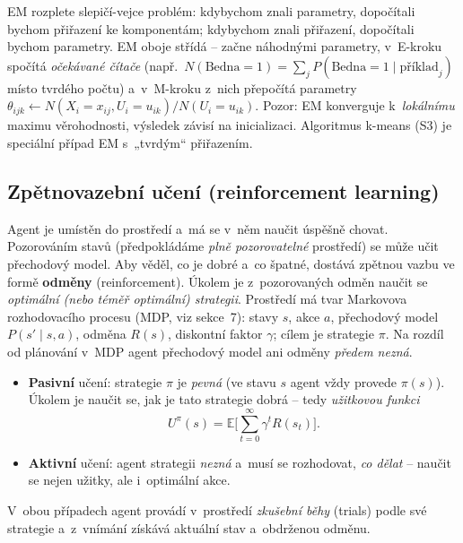 \begin{intuice}
EM rozplete slepičí-vejce problém: kdybychom znali parametry, dopočítali bychom přiřazení ke komponentám; kdybychom znali přiřazení, dopočítali bychom parametry. EM oboje střídá -- začne náhodnými parametry, v~E-kroku spočítá \emph{očekávané čítače} (např.\ $N(\text{Bedna}{=}1)=\sum_j P(\text{Bedna}{=}1\mid \text{příklad}_j)$ místo tvrdého počtu) a~v~M-kroku z~nich přepočítá parametry $\theta_{ijk}\leftarrow N(X_i{=}x_{ij},U_i{=}u_{ik})/N(U_i{=}u_{ik})$. Pozor: EM konverguje k~\emph{lokálnímu} maximu věrohodnosti, výsledek závisí na inicializaci. Algoritmus k-means (S3) je speciální případ EM s~„tvrdým`` přiřazením.
\end{intuice}

\subsection{Zpětnovazební učení (reinforcement learning)}

Agent je umístěn do prostředí a~má se v~něm naučit úspěšně chovat. Pozorováním stavů (předpokládáme \emph{plně pozorovatelné} prostředí) se může učit přechodový model. Aby věděl, co je dobré a~co špatné, dostává zpětnou vazbu ve formě \textbf{odměny} (reinforcement). Úkolem je z~pozorovaných odměn naučit se \emph{optimální (nebo téměř optimální) strategii}. Prostředí má tvar Markovova rozhodovacího procesu (MDP, viz sekce~7): stavy $s$, akce $a$, přechodový model $P(s'\mid s,a)$, odměna $R(s)$, diskontní faktor $\gamma$; cílem je strategie $\pi$. Na rozdíl od plánování v~MDP agent přechodový model ani odměny \emph{předem nezná}.

\begin{definice}
\begin{itemize}
  \item \textbf{Pasivní} učení: strategie $\pi$ je \emph{pevná} (ve stavu $s$ agent vždy provede $\pi(s)$). Úkolem je naučit se, jak je tato strategie dobrá -- tedy \emph{užitkovou funkci}
  \[ U^{\pi}(s) = \mathbb{E}\Big[\textstyle\sum_{t=0}^{\infty}\gamma^{t}R(s_t)\Big]. \]
  \item \textbf{Aktivní} učení: agent strategii \emph{nezná} a~musí se rozhodovat, \emph{co dělat} -- naučit se nejen užitky, ale i~optimální akce.
\end{itemize}
V~obou případech agent provádí v~prostředí \emph{zkušební běhy} (trials) podle své strategie a~z~vnímání získává aktuální stav a~obdrženou odměnu.
\end{definice}


